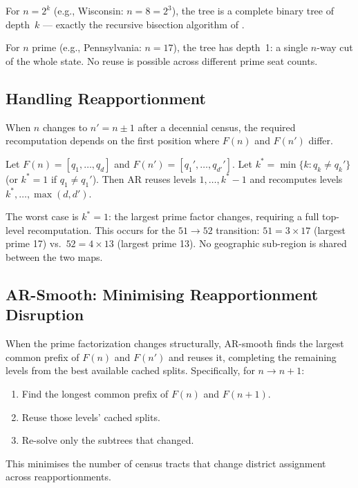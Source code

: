 For $n = 2^k$ (e.g., Wisconsin: $n = 8 = 2^3$), the tree is a complete binary
tree of depth~$k$ --- exactly the recursive bisection algorithm of
\citet{dellaLibera2026mec}.

For $n$ prime (e.g., Pennsylvania: $n = 17$), the tree has depth~1: a single
$n$-way cut of the whole state. No reuse is possible across different prime seat
counts.

\subsection{Handling Reapportionment}
\label{sec:reapportionment}

When $n$ changes to $n' = n \pm 1$ after a decennial census, the required
recomputation depends on the first position where $F(n)$ and $F(n')$ differ.

\begin{proposition}
  Let $F(n) = [q_1, \ldots, q_d]$ and $F(n') = [q_1', \ldots, q_{d'}']$.
  Let $k^* = \min\{k : q_k \neq q_k'\}$ (or $k^* = 1$ if $q_1 \neq q_1'$).
  Then AR reuses levels $1, \ldots, k^*-1$ and recomputes levels
  $k^*, \ldots, \max(d, d')$.
\end{proposition}

The worst case is $k^* = 1$: the largest prime factor changes, requiring a
full top-level recomputation. This occurs for the $51 \to 52$ transition:
$51 = 3 \times 17$ (largest prime 17) vs.\ $52 = 4 \times 13$ (largest prime 13).
No geographic sub-region is shared between the two maps.

\subsection{AR-Smooth: Minimising Reapportionment Disruption}
\label{sec:smooth}

When the prime factorization changes structurally, AR-smooth finds the
largest common prefix of $F(n)$ and $F(n')$ and reuses it, completing the
remaining levels from the best available cached splits. Specifically, for
$n \to n+1$:
\begin{enumerate}
  \item Find the longest common prefix of $F(n)$ and $F(n+1)$.
  \item Reuse those levels' cached splits.
  \item Re-solve only the subtrees that changed.
\end{enumerate}
This minimises the number of census tracts that change district assignment
across reapportionments.

